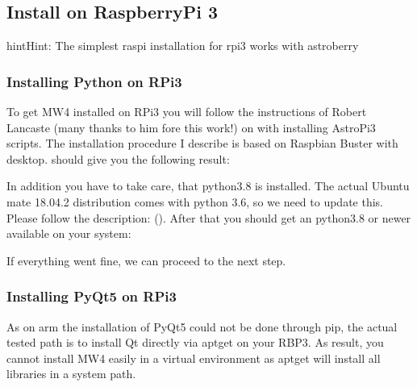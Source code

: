 \documentclass[a4paper,10pt,english]{sphinxmanual}
\begin{document}
\sphinxstepscope


\subsection{Install on RaspberryPi 3}
\label{\detokenize{install/rpi3:install-on-raspberrypi-3}}\label{\detokenize{install/rpi3::doc}}
\begin{sphinxadmonition}{hint}{Hint:}
\sphinxAtStartPar
The simplest raspi installation for rpi3 works with astroberry
\end{sphinxadmonition}


\subsubsection{Installing Python on RPi3}
\label{\detokenize{install/rpi3:installing-python-on-rpi3}}
\sphinxAtStartPar
To get MW4 installed on RPi3 you will follow the instructions of Robert Lancaste
(many thanks to him fore this work!) on  with
installing AstroPi3 scripts. The installation procedure I describe is based on
Raspbian Buster with desktop.
should give you the following result:


\sphinxAtStartPar
In addition you have to take care, that python3.8 is installed. The
actual Ubuntu mate 18.04.2 distribution comes with python 3.6, so we need to
update this. Please follow the description: {\hyperref[\detokenize{install/python:ubuntu}]{}} (). After that you should
get an python3.8 or newer available on your system:


\sphinxAtStartPar
If everything went fine, we can proceed to the next step.


\subsubsection{Installing PyQt5 on RPi3}
\label{\detokenize{install/rpi3:installing-pyqt5-on-rpi3}}
\sphinxAtStartPar
As on arm the installation of PyQt5 could not be done through pip, the actual
tested path is to install Qt directly via apt\sphinxhyphen{}get on your RBP3. As result, you
cannot install MW4 easily in a virtual environment as apt\sphinxhyphen{}get will install all
libraries in a system path.
\end{document}
